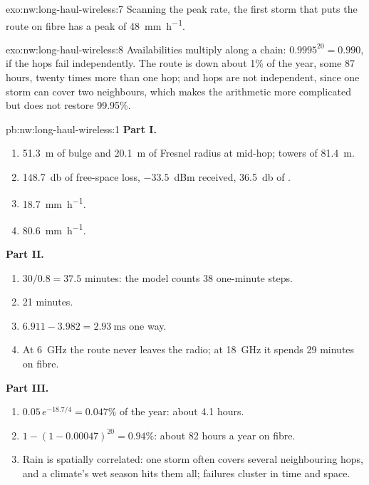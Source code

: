 \begin{solution}{exo:nw:long-haul-wireless:7}
Scanning the peak rate, the first storm that puts the route on fibre has a peak of \qty{48}{\milli\metre\per\hour}.
\end{solution}

\begin{solution}{exo:nw:long-haul-wireless:8}
Availabilities multiply along a chain: $0.9995^{20} = 0.990$, if the hops fail independently. The route is down about 1\% of the year, some
87 hours, twenty times more than one hop; and hops are not independent, since one storm can cover two neighbours, which makes the arithmetic
more complicated but does not restore 99.95\%.
\end{solution}

\begin{solution}{pb:nw:long-haul-wireless:1}
\textbf{Part I.}
\begin{enumerate}
\item \qty{51.3}{\metre} of bulge and \qty{20.1}{\metre} of Fresnel radius at mid-hop; towers of \qty{81.4}{\metre}.
\item \qty{148.7}{\decibel} of free-space loss, $-33.5$~dBm received, \qty{36.5}{\decibel} of .
\item \qty{18.7}{\milli\metre\per\hour}.
\item \qty{80.6}{\milli\metre\per\hour}.
\end{enumerate}
\textbf{Part II.}
\begin{enumerate}[resume]
\item $30/0.8 = 37.5$ minutes: the model counts 38 one-minute steps.
\item 21 minutes.
\item $6.911 - 3.982 = \qty{2.93}{\milli\second}$ one way.
\item At \qty{6}{\giga\hertz} the route never leaves the radio; at \qty{18}{\giga\hertz} it spends 29 minutes on fibre.
\end{enumerate}
\textbf{Part III.}
\begin{enumerate}[resume]
\item $0.05\,e^{-18.7/4} = 0.047\%$ of the year: about 4.1 hours.
\item $1 - (1 - 0.00047)^{20} = 0.94\%$: about 82 hours a year on fibre.
\item Rain is spatially correlated: one storm often covers several neighbouring hops, and a climate's wet season hits them all; failures cluster in
  time and space.

\end{enumerate}
\end{solution}
